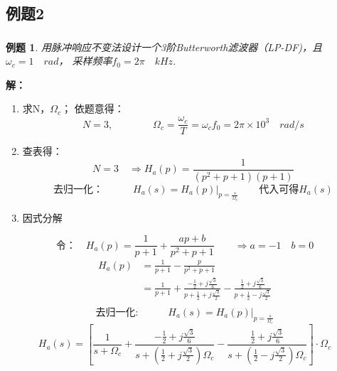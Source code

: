 \documentclass[notheorems,compress,mathserif,table]{beamer}
\newtheorem{example}{例题}
\begin{document}
\subsection{例题2}
\begin{frame}[allowframebreaks]\frametitle{}%
\begin{example}
用脉冲响应不变法设计一个3阶Butterworth滤波器（LP-DF)，且$\omega_c = 1\quad rad$，
采样频率$f_0 = 2\pi\quad kHz$.
\end{example}
\par \textbf{解：}
\begin{enumerate}
  \item 求N，$\Omega_c$；
      依题意得：
      $$N=3,\qquad\qquad \Omega_c = \frac{\omega_c}{T}=\omega_c f_0 = 2\pi\times 10^3 \quad rad/s$$
  \item 查表得：
      $$N = 3\quad \Longrightarrow H_a(p) = \frac{1}{(p^2 + p+1)(p+1)}$$
      $$\mbox{去归一化：}\quad\quad\quad
      H_a(s) = H_a(p)\Big|_{p=\frac{s}{\Omega_c}}\quad\quad\mbox{代入可得$H_a(s)$}$$
  \item 因式分解
  \end{enumerate}
  $$\mbox{令：}\quad H_a(p) = \frac{1}{p+1}+\frac{ap+b}{p^2+p+1}\quad\quad
  \Longrightarrow a=-1\quad b=0$$
  \begin{equation*}
  \begin{split}
  H_a(p)
           &= \frac{1}{p+1}-\frac{p}{p^2+p+1}\\
           &= \frac{1}{p+1}+
              \frac{-\frac{1}{2}+j\frac{\sqrt{3}}{6}}
                        {p+\frac{1}{2}+j\frac{\sqrt{3}}{2}}-
              \frac{\frac{1}{2}+j\frac{\sqrt{3}}{6}}
                        {p+\frac{1}{2}-j\frac{\sqrt{3}}{2}}\\
  \end{split}
  \end{equation*}
  $$\mbox{去归一化:}\quad\quad\quad  H_a(s) = H_a(p)\Big|_{p=\frac{s}{\Omega_c}}$$
  $$H_a(s)= \left[\frac{1}{s+\Omega_c}+
            \frac{-\frac{1}{2}+j\frac{\sqrt{3}}{6}}
                {s+(\frac{1}{2}+j\frac{\sqrt{3}}{2})\Omega_c}-
            \frac{\frac{1}{2}+j\frac{\sqrt{3}}{6}}
                {s+(\frac{1}{2}-j\frac{\sqrt{3}}{2})\Omega_c}\right]\cdot\Omega_c
  $$
\end{frame}
\end{document}
